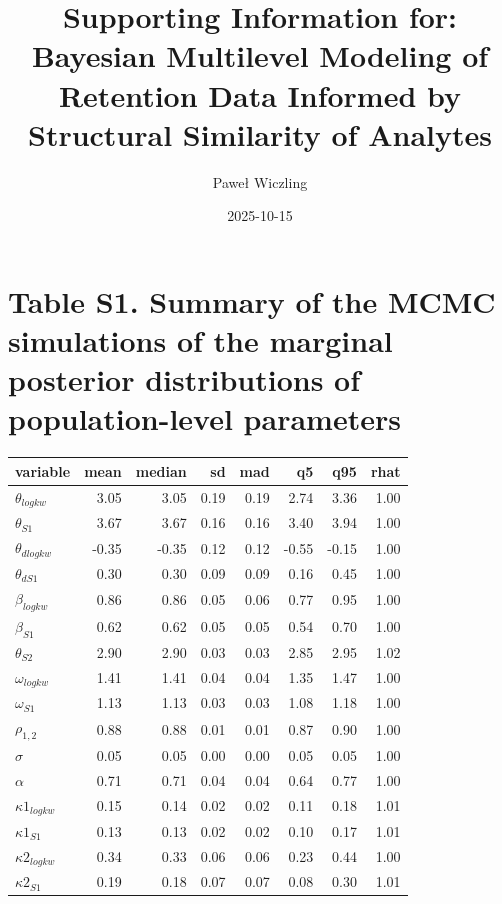 \documentclass[
]{article}
\title{Supporting Information for:\\
Bayesian Multilevel Modeling of Retention Data Informed by Structural
Similarity of Analytes}
\author{Paweł Wiczling}
\affil{%
                  Department of Biopharmaceutics and Pharmacodynamics,
                  Medical University of Gdańsk, Gen.~J. Hallera 107,
                  80-416 Gdańsk, Poland
              }
\date{2025-10-15}
\renewcommand*\contentsname{Table of contents}
\newcommand\contentsname{Table of contents}
\begin{document}
\maketitle
\ifdefined\Shaded\renewenvironment{Shaded}{\begin{tcolorbox}[borderline west={3pt}{0pt}{shadecolor}, enhanced, breakable, frame hidden, boxrule=0pt, sharp corners, interior hidden]}{\end{tcolorbox}}\fi

\renewcommand*\contentsname{Table of contents}
{
\hypersetup{linkcolor=}
\setcounter{tocdepth}{3}
\tableofcontents
}
\newpage{}

\hypertarget{table-s1.-summary-of-the-mcmc-simulations-of-the-marginal-posterior-distributions-of-population-level-parameters}{%
\section{Table S1. Summary of the MCMC simulations of the marginal
posterior distributions of population-level
parameters}\label{table-s1.-summary-of-the-mcmc-simulations-of-the-marginal-posterior-distributions-of-population-level-parameters}}

\begin{tabular}[t]{l|r|r|r|r|r|r|r}
\hline
variable & mean & median & sd & mad & q5 & q95 & rhat\\
\hline
$\theta_{logkw}$ & 3.05 & 3.05 & 0.19 & 0.19 & 2.74 & 3.36 & 1.00\\
\hline
$\theta_{S1}$ & 3.67 & 3.67 & 0.16 & 0.16 & 3.40 & 3.94 & 1.00\\
\hline
$\theta_{dlogkw}$ & -0.35 & -0.35 & 0.12 & 0.12 & -0.55 & -0.15 & 1.00\\
\hline
$\theta_{dS1}$ & 0.30 & 0.30 & 0.09 & 0.09 & 0.16 & 0.45 & 1.00\\
\hline
$\beta_{logkw}$ & 0.86 & 0.86 & 0.05 & 0.06 & 0.77 & 0.95 & 1.00\\
\hline
$\beta_{S1}$ & 0.62 & 0.62 & 0.05 & 0.05 & 0.54 & 0.70 & 1.00\\
\hline
$\theta_{S2}$ & 2.90 & 2.90 & 0.03 & 0.03 & 2.85 & 2.95 & 1.02\\
\hline
$\omega_{logkw}$ & 1.41 & 1.41 & 0.04 & 0.04 & 1.35 & 1.47 & 1.00\\
\hline
$\omega_{S1}$ & 1.13 & 1.13 & 0.03 & 0.03 & 1.08 & 1.18 & 1.00\\
\hline
$\rho_{1,2}$ & 0.88 & 0.88 & 0.01 & 0.01 & 0.87 & 0.90 & 1.00\\
\hline
$\sigma$ & 0.05 & 0.05 & 0.00 & 0.00 & 0.05 & 0.05 & 1.00\\
\hline
$\alpha$ & 0.71 & 0.71 & 0.04 & 0.04 & 0.64 & 0.77 & 1.00\\
\hline
$\kappa1_{logkw}$ & 0.15 & 0.14 & 0.02 & 0.02 & 0.11 & 0.18 & 1.01\\
\hline
$\kappa1_{S1}$ & 0.13 & 0.13 & 0.02 & 0.02 & 0.10 & 0.17 & 1.01\\
\hline
$\kappa2_{logkw}$ & 0.34 & 0.33 & 0.06 & 0.06 & 0.23 & 0.44 & 1.00\\
\hline
$\kappa2_{S1}$ & 0.19 & 0.18 & 0.07 & 0.07 & 0.08 & 0.30 & 1.01\\
\hline
\end{tabular}
\end{document}

